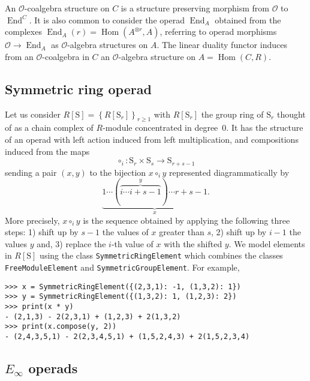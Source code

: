 \documentclass{amsart}
\renewcommand{\S}{\mathrm{S}}
\DeclareMathOperator{\Hom}{Hom}
\DeclareMathOperator{\End}{End}
\begin{document}
An $\mathcal O$-coalgebra structure on $C$ is a structure preserving morphism from $\mathcal O$ to $\End^C$.
It is also common to consider the operad $\End_A$ obtained from the complexes $\End_A(r) =  \Hom(A^{\otimes r}, A)$, referring to operad morphisms $\mathcal O \to \End_A$ as $\mathcal O$-algebra structures on $A$.
The linear duality functor induces from an $\mathcal O$-coalgebra in $C$ an $\mathcal O$-algebra structure on $A = \Hom(C, R)$.

\subsection{Symmetric ring operad}

Let us consider $R[\S] = \left\{R[\S_r]\right\}_{r \geq 1}$ with $R[\S_r]$ the group ring of $\S_r$ thought of as a chain complex of $R$-module concentrated in degree~$0$.
It has the structure of an operad with left action induced from left multiplication, and compositions induced from the maps
\begin{equation} \label{eq: compostion of permutations}
\circ_i \colon \S_r \times \S_s \to \S_{r+s-1}
\end{equation}
sending a pair $(x, y)$ to the bijection $x \circ_i y$ represented diagrammatically by
\begin{equation*}
\underbrace{1 \cdots (\overbrace{i \cdots i+s-1}^y) \cdots r+s-1}_x.
\end{equation*}
More precisely, $x \circ_i y$ is the sequence obtained by applying the following three steps: 1) shift up by $s-1$ the values of $x$ greater than $s$, 2) shift up by $i-1$ the values $y$ and, 3) replace the $i$-th value of $x$ with the shifted $y$.
We model elements in $R[\S]$ using the class \texttt{SymmetricRingElement} which combines the classes \texttt{FreeModuleElement} and \texttt{SymmetricGroupElement}.
For example,

\begin{Verbatim}[frame=lines, samepage=true]
>>> x = SymmetricRingElement({(2,3,1): -1, (1,3,2): 1})
>>> y = SymmetricRingElement({(1,3,2): 1, (1,2,3): 2})
>>> print(x * y)
- (2,1,3) - 2(2,3,1) + (1,2,3) + 2(1,3,2)
>>> print(x.compose(y, 2))
- (2,4,3,5,1) - 2(2,3,4,5,1) + (1,5,2,4,3) + 2(1,5,2,3,4)
\end{Verbatim}

\subsection{\texorpdfstring{$E_\infty$}{E-infinity} operads}
\end{document}
